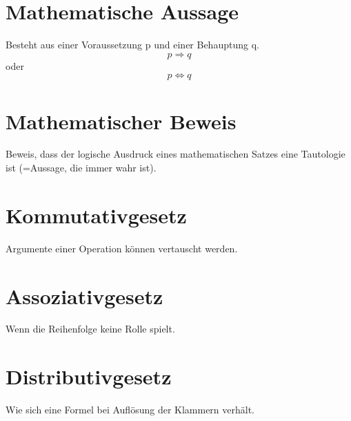 \documentclass[12pt]{article}
\begin{document}
    \section*{Mathematische Aussage}
    Besteht aus einer Voraussetzung p und einer Behauptung q.
    \[ p \Rightarrow q \] oder \[ p \Leftrightarrow q \]
    \section*{Mathematischer Beweis}
    Beweis, dass der logische Ausdruck eines mathematischen Satzes eine Tautologie ist (=Aussage, die immer wahr ist).

    \section*{Kommutativgesetz}
    Argumente einer Operation können vertauscht werden.

    \section*{Assoziativgesetz}
    Wenn die Reihenfolge keine Rolle spielt.

    \section*{Distributivgesetz}
    Wie sich eine Formel bei Auflösung der Klammern verhält.
\end{document}
